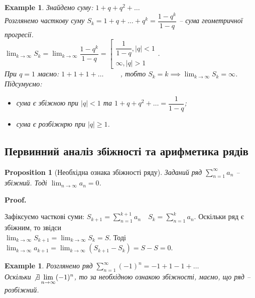 \documentclass[a4paper, 10pt]{article}
\makeatletter
\def\huge{\displaystyle}
\theoremstyle{theoremdd}
\theoremstyle{theoremdd}
\theoremstyle{theoremdd}
\theoremstyle{theoremdd}
\theoremstyle{theoremdd}
\newtheorem{example}[theorem]{Example}
\theoremstyle{theoremdd}
\newtheorem{proposition}[theorem]{Proposition}
\theoremstyle{theoremdd}
\theoremstyle{theoremdd}
\theoremstyle{theoremdd}
\renewenvironment{proof}[1][Proof.\\]{\par
\pushQED{\hfill \qed}%
\normalfont \topsep6\p@\@plus6\p@\relax
\trivlist
\item\relax
{\bfseries
#1\@addpunct{.}}\hspace\labelsep\ignorespaces
}{%
\popQED\endtrivlist\@endpefalse
}
\makeatother
\begin{document}
\begin{example}
Знайдемо суму: $1 + q + q^2 + \dots$\\
Розглянемо часткову суму $S_k = 1 + q + \dots + q^k = \dfrac{1 - q^k}{1 - q}$ -- сума геометричної прогресії.\\
$\huge \lim_{k \to \infty} S_k = \lim_{k \to \infty} \dfrac{1-q^k}{1 - q} = \left[ \begin{gathered} \dfrac{1}{1-q}, |q|<1 \\ \infty, |q|>1 \end{gathered} \right.$.
\\
При $q = 1$ маємо: $1 + 1 + 1 + \dots \hspace{1cm}$, тобто $S_k = k \implies \huge \lim_{k \to \infty} S_k = \infty$.\\
Підсумуємо:
\begin{itemize}[nosep,wide=0pt,label={-}]
\item сума є збіжною при $|q| < 1$ та $1 + q + q^2 + \dots = \dfrac{1}{1-q}$;
\item сума є розбіжнрю при $|q| \geq 1$.
\end{itemize}
\end{example}

\subsection{Первинний аналіз збіжності та арифметика рядів}
\begin{proposition}[Необхідна ознака збіжності ряду]
Заданий ряд $\huge \sum_{n=1}^{\infty} a_n$ -- збіжний. Тоді $\huge \lim_{n \to \infty} a_n = 0$.
\end{proposition}

\begin{proof}
Зафіксуємо часткові суми: $\huge S_{k+1} = \sum_{n=1}^{k+1} a_n \quad S_{k} = \sum_{n=1}^{k} a_n$. Оскільки ряд є збіжним, то звідси \\ $\huge \lim_{k \to \infty} S_{k+1} = \lim_{k \to \infty} S_k = S$. Тоді $\huge \lim_{k \to \infty} a_{k+1} = \lim_{k \to \infty} (S_{k+1} - S_k) = S - S = 0$.
\end{proof}

\begin{example}
Розглянемо ряд $\huge \sum_{n=1}^{\infty} (-1)^n = -1 + 1 - 1 + \dots$\\
Оскільки $\not\exists \huge \lim_{n \to \infty} (-1)^n$, то за необхідною ознакою збіжності, маємо, що ряд -- розбіжний.
\end{example}
\end{document}
